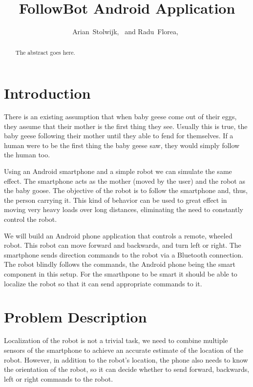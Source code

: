 \documentclass[journal]{IEEEtran}
\begin{document}
\title{FollowBot Android Application}


\author{Arian~Stolwijk,~
        and Radu~Florea,~}%

%
{}
\maketitle

\begin{abstract}
The abstract goes here.
\end{abstract}

\section{Introduction}

There is an existing assumption that when baby geese come out of their eggs,
they assume that their mother is the first thing they see. Usually this is
true, the baby geese following their mother until they able to fend for
themselves. If a human were to be the first thing the baby geese saw, they
would simply follow the human too.

Using an Android smartphone and a simple robot we can simulate the same effect.
The smartphone acts as the mother (moved by the user) and the robot as the baby
goose. The objective of the robot is to follow the smartphone and, thus, the
person carrying it. This kind of behavior can be used to great effect in moving
very heavy loads over long distances, eliminating the need to constantly
control the robot.

We will build an Android phone application that controls a remote, wheeled
robot. This robot can move forward and backwards, and turn left or right. The
smartphone sends direction commands to the robot via a Bluetooth connection.
The robot blindly follows the commands, the Android phone being the smart
component in this setup. For the smarthpone to be smart it should be able to
localize the robot so that it can send appropriate commands to it.

\section{Problem Description}

Localization of the robot is not a trivial task, we need to combine multiple
sensors of the smartphone to achieve an accurate estimate of the location of
the robot. However, in addition to the robot's location, the phone also needs
to know the orientation of the robot, so it can decide whether to send forward,
backwards, left or right commands to the robot.
\end{document}
